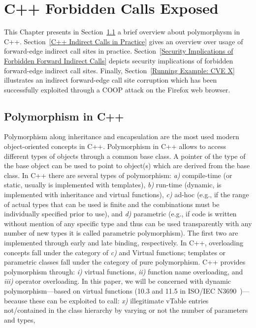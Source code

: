 \chapter{C++ Forbidden Calls Exposed}
\label{C++ Bad Forward Indirect Calls}
This Chapter presents in Section~\ref{Polymorphism in C++} 
a brief overview about polymorphysm in C++. 
Section~\ref{C++ Indirect Calls in Practice} gives an overview over
usage of forward-edge indirect call sites in practice.
Section~\ref{Security Implications of Forbidden Forward Indirect Calls}
depicts security implications of forbidden forward-edge indirect call sites.
Finally, Section~\ref{Running Example: CVE X} illustrates an indirect forward-edge 
call site corruption which has been successfully exploited 
through a COOP attack on the Firefox web browser.

\section{Polymorphism in C++}
\label{Polymorphism in C++}
Polymorphism along inheritance and encapsulation
are the most used modern object-oriented concepts
in C++. 
Polymorphism in C++ allows to access different types of objects 
through a common base class. A pointer of the type of the base object
can be used to point to object(s) which are derived from the base class.
In C++ there are several types of polymorphism:
\textit{a)} compile-time (or static, usually is implemented with templates), 
\textit{b)} run-time (dynamic, is implemented with inheritance and virtual functions), 
\textit{c)} ad-hoc (e.g., if the range of actual types that can be used 
is finite and the combinations must be individually specified prior to use), and
\textit{d)} parametric (e.g., if code is written without mention of any 
specific type and thus can be used transparently with any number of new types it
is called parametric polymorphism). 
The first two are implemented through early 
and late binding, respectively.
In C++, overloading concepts fall under the category of \textit{c)} and Virtual functions;
templates or parametric classes fall under the category of pure polymorphism.
C++ provides polymorphism through: 
\textit{i)} virtual functions,
\textit{ii)} function name overloading, and 
\textit{iii)} operator overloading. 
In this paper, we will be concerned with dynamic 
polymorphism---based on virtual functions (10.3 and 11.5 in 
ISO/IEC N3690~\cite{iso:iecN3690})---because these can be exploited to 
call: 
\textit{x)} illegitimate vTable entries not/contained in the 
class hierarchy by varying or not the number of parameters and types,
